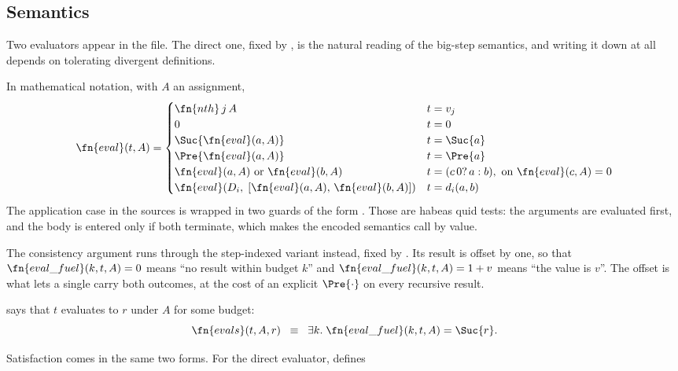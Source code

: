 \subsection{Semantics}
\label{sec:fuel}

Two evaluators appear in the file.  The direct one, fixed by
, is the natural reading of the \BGA{} big-step semantics,
and writing it down at all depends on \QGA{} tolerating divergent definitions.


\noindent
In mathematical notation, with $A$ an assignment,
\[
\fn{eval}(t, A) =
\begin{cases}
\fn{nth}\,j\,A                     & t = v_j\\
0                                  & t = 0\\
\Suc{\fn{eval}(a, A)}              & t = \Suc{a}\\
\Pre{\fn{eval}(a, A)}              & t = \Pre{a}\\
\fn{eval}(a, A) \text{ or } \fn{eval}(b, A)
                                   & t = (c\,0?\,a:b), \text{ on } \fn{eval}(c, A) = 0\\
\fn{eval}(D_i,\; [\fn{eval}(a, A),\, \fn{eval}(b, A)])
                                   & t = d_i(a, b)
\end{cases}
\]
The application case in the sources is wrapped in two guards of the form
.  Those are habeas quid tests: the arguments are
evaluated first, and the body is entered only if both terminate, which makes
the encoded semantics call by value.

The consistency argument runs through the step-indexed variant instead, fixed
by .  Its result is offset by one, so that
$\fn{eval\_fuel}(k, t, A) = 0$ means ``no result within budget $k$'' and
$\fn{eval\_fuel}(k, t, A) = 1 + v$ means ``the value is $v$''.  The offset is
what lets a single  carry both outcomes, at the cost of an explicit
$\Pre{\cdot}$ on every recursive result.


\noindent
{} says that $t$ evaluates to $r$ under $A$ for some budget:
\[
\fn{evals}(t, A, r) \;\;\equiv\;\; \exists k.\; \fn{eval\_fuel}(k, t, A) = \Suc{r}.
\]

Satisfaction comes in the same two forms.  For the direct evaluator,
 defines


